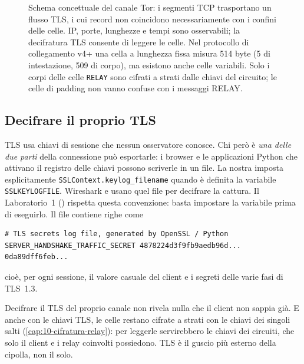 \begin{figure}[htbp]
\centering

\caption{Schema concettuale del canale Tor: i segmenti TCP trasportano un flusso TLS, i cui record non coincidono necessariamente con i confini delle celle. IP, porte, lunghezze e tempi sono osservabili; la decifratura TLS consente di leggere le celle. Nel protocollo di collegamento v4+ una cella a lunghezza fissa misura 514 byte (5 di intestazione, 509 di corpo), ma esistono anche celle variabili. Solo i corpi delle celle \texttt{RELAY} sono cifrati a strati dalle chiavi del circuito; le celle di padding non vanno confuse con i messaggi RELAY.}
\label{fig:incapsulamento}
\end{figure}

\subsection{Decifrare il proprio TLS}

TLS usa chiavi di sessione che nessun osservatore conosce. Chi però è \emph{una delle due parti} della connessione può esportarle: i browser e le applicazioni Python che attivano il registro delle chiavi possono scriverle in un file. La nostra  imposta esplicitamente \texttt{SSLContext.keylog\_filename} quando è definita la variabile \texttt{SSLKEYLOGFILE}. Wireshark e  usano quel file per decifrare la cattura. Il Laboratorio~1 () rispetta questa convenzione: basta impostare la variabile prima di eseguirlo. Il file contiene righe come
\begin{lstlisting}[numbers=none]
# TLS secrets log file, generated by OpenSSL / Python
SERVER_HANDSHAKE_TRAFFIC_SECRET 4878224d3f9fb9aedb96d... 0da89dff6feb...
\end{lstlisting}
cioè, per ogni sessione, il valore casuale del client e i segreti delle varie fasi di TLS~1.3.

\begin{approfondimento}
Decifrare il TLS del proprio canale non rivela nulla che il client non sappia già. E anche con le chiavi TLS, le celle  restano cifrate a strati con le chiavi dei singoli salti (\cref{cap:10-cifratura-relay}): per leggerle servirebbero le chiavi dei circuiti, che solo il client e i relay coinvolti possiedono. TLS è il guscio più esterno della cipolla, non il solo.
\end{approfondimento}

